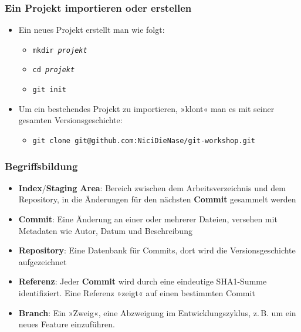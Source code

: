 \documentclass{beamer}
\begin{document}
\begin{frame}
 \frametitle{Ein Projekt importieren oder erstellen}

\begin{itemize}
  \item Ein neues Projekt erstellt man wie folgt:
\begin{itemize}
  \item \texttt{mkdir \emph{projekt}}
  \item \texttt{cd \emph{projekt}}
  \item \texttt{git init}
\end{itemize}
\end{itemize}

\begin{itemize}
  \item Um ein bestehendes Projekt zu importieren, »klont« man es mit seiner gesamten Versionsgeschichte:
\begin{itemize}
  \item \texttt{git clone git@github.com:NiciDieNase/git-workshop.git}
\end{itemize}
\end{itemize}

  
 \end{frame}
\begin{frame}
 \frametitle{Begriffsbildung}
  


\begin{itemize}
  \item \textbf{Index}/\textbf{Staging Area}: Bereich zwischen dem Arbeitsverzeichnis und dem Repository, in die Änderungen für den nächsten \textbf{Commit} gesammelt werden
  \item \textbf{Commit}: Eine Änderung an einer oder mehrerer Dateien, versehen mit Metadaten wie Autor, Datum und Beschreibung
  \item \textbf{Repository}: Eine Datenbank für Commits, dort wird die Versionsgeschichte aufgezeichnet
  \item \textbf{Referenz}: Jeder \textbf{Commit} wird durch eine eindeutige SHA1-Summe identifiziert. Eine Referenz »zeigt« auf einen bestimmten Commit
  \item \textbf{Branch}: Ein »Zweig«, eine Abzweigung im Entwicklungszyklus, z.\,B. um ein neues Feature einzuführen.
\end{itemize}

  
 \end{frame}
\end{document}
